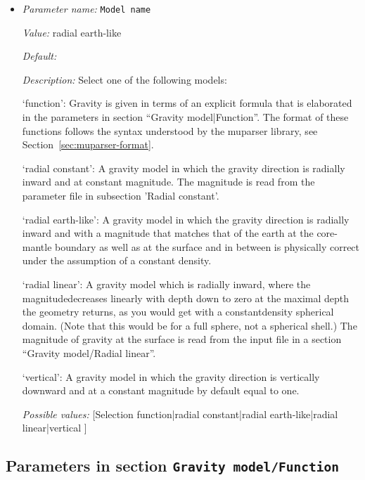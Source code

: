 \begin{itemize}
\item {\it Parameter name:} {\tt Model name}
\label{parameters:Gravity model/Model name}


{\it Value:} radial earth-like


{\it Default:} 


{\it Description:} Select one of the following models:

`function': Gravity is given in terms of an explicit formula that is elaborated in the parameters in section ``Gravity model|Function''. The format of these functions follows the syntax understood by the muparser library, see Section~\ref{sec:muparser-format}.

`radial constant': A gravity model in which the gravity direction is radially inward and at constant magnitude. The magnitude is read from the parameter file in subsection 'Radial constant'.

`radial earth-like': A gravity model in which the gravity direction is radially inward and with a magnitude that matches that of the earth at the core-mantle boundary as well as at the surface and in between is physically correct under the assumption of a constant density.

`radial linear': A gravity model which is radially inward, where the magnitudedecreases linearly with depth down to zero at the maximal depth the geometry returns, as you would get with a constantdensity spherical domain. (Note that this would be for a full sphere, not a spherical shell.) The magnitude of gravity at the surface is read from the input file in a section ``Gravity model/Radial linear''.

`vertical': A gravity model in which the gravity direction is vertically downward and at a constant magnitude by default equal to one.


{\it Possible values:} [Selection function|radial constant|radial earth-like|radial linear|vertical ]
\end{itemize}



\subsection{Parameters in section \tt Gravity model/Function}
\label{parameters:Gravity_20model/Function}

